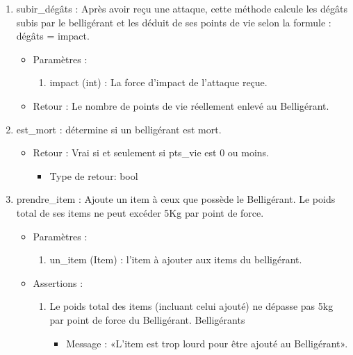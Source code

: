 \documentclass[12pt,pdftex,oneside]{article}
\begin{document}
\begin{itemize}
\begin{enumerate}
    \item subir\_dégâts : Après avoir reçu une attaque, cette méthode calcule les
      dégâts subis par le belligérant et les déduit de ses points de vie selon
      la formule : dégâts = impact.
      \begin{itemize}
      \item Paramètres : 
        \begin{enumerate}
        \item impact (int) : La force d'impact de l'attaque reçue.
        \end{enumerate}
      \item Retour : Le nombre de points de vie réellement enlevé au Belligérant.
      \end{itemize}

    \item est\_mort : détermine si un belligérant est mort.
      \begin{itemize}
      \item Retour : Vrai si et seulement si pts\_vie est 0 ou moins.
          \begin{itemize}
          \item Type de retour: bool
          \end{itemize}
      \end{itemize}

    \item prendre\_item : Ajoute un item à ceux que possède le Belligérant. Le
      poids total de ses items ne peut excéder 5Kg par point de force.
      \begin{itemize}
      \item Paramètres : 
        \begin{enumerate}
        \item un\_item (Item) : l'item à ajouter aux items du belligérant.
        \end{enumerate}
      \item Assertions : 
        \begin{enumerate}
            \item Le poids total des items (incluant celui ajouté) ne dépasse
              pas 5kg par point de force du Belligérant.
            Belligérants
            \begin{itemize}
              \item Message : «L'item est trop lourd pour être ajouté au Belligérant».
            \end{itemize}
        \end{enumerate}
      \end{itemize}


\end{enumerate}
\end{itemize}
\end{document}
